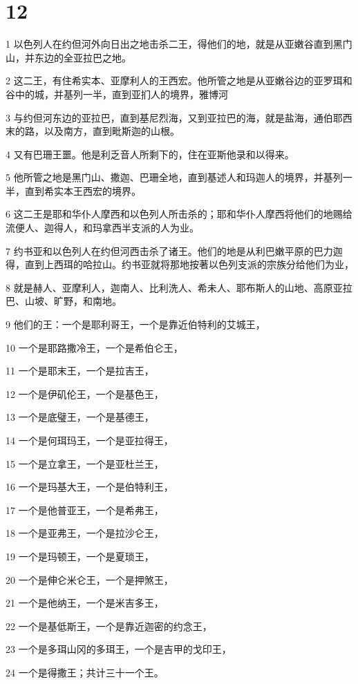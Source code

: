\chapter{12}

\par 1 以色列人在约但河外向日出之地击杀二王，得他们的地，就是从亚嫩谷直到黑门山，并东边的全亚拉巴之地。
\par 2 这二王，有住希实本、亚摩利人的王西宏。他所管之地是从亚嫩谷边的亚罗珥和谷中的城，并基列一半，直到亚扪人的境界，雅博河
\par 3 与约但河东边的亚拉巴，直到基尼烈海，又到亚拉巴的海，就是盐海，通伯耶西末的路，以及南方，直到毗斯迦的山根。
\par 4 又有巴珊王噩。他是利乏音人所剩下的，住在亚斯他录和以得来。
\par 5 他所管之地是黑门山、撒迦、巴珊全地，直到基述人和玛迦人的境界，并基列一半，直到希实本王西宏的境界。
\par 6 这二王是耶和华仆人摩西和以色列人所击杀的；耶和华仆人摩西将他们的地赐给流便人、迦得人，和玛拿西半支派的人为业。
\par 7 约书亚和以色列人在约但河西击杀了诸王。他们的地是从利巴嫩平原的巴力迦得，直到上西珥的哈拉山。约书亚就将那地按著以色列支派的宗族分给他们为业，
\par 8 就是赫人、亚摩利人，迦南人、比利洗人、希未人、耶布斯人的山地、高原亚拉巴、山坡、旷野，和南地。
\par 9 他们的王：一个是耶利哥王，一个是靠近伯特利的艾城王，
\par 10 一个是耶路撒冷王，一个是希伯仑王，
\par 11 一个是耶末王，一个是拉吉王，
\par 12 一个是伊矶伦王，一个是基色王，
\par 13 一个是底璧王，一个是基德王，
\par 14 一个是何珥玛王，一个是亚拉得王，
\par 15 一个是立拿王，一个是亚杜兰王，
\par 16 一个是玛基大王，一个是伯特利王，
\par 17 一个是他普亚王，一个是希弗王，
\par 18 一个是亚弗王，一个是拉沙仑王，
\par 19 一个是玛顿王，一个是夏琐王，
\par 20 一个是伸仑米仑王，一个是押煞王，
\par 21 一个是他纳王，一个是米吉多王，
\par 22 一个是基低斯王，一个是靠近迦密的约念王，
\par 23 一个是多珥山冈的多珥王，一个是吉甲的戈印王，
\par 24 一个是得撒王；共计三十一个王。

